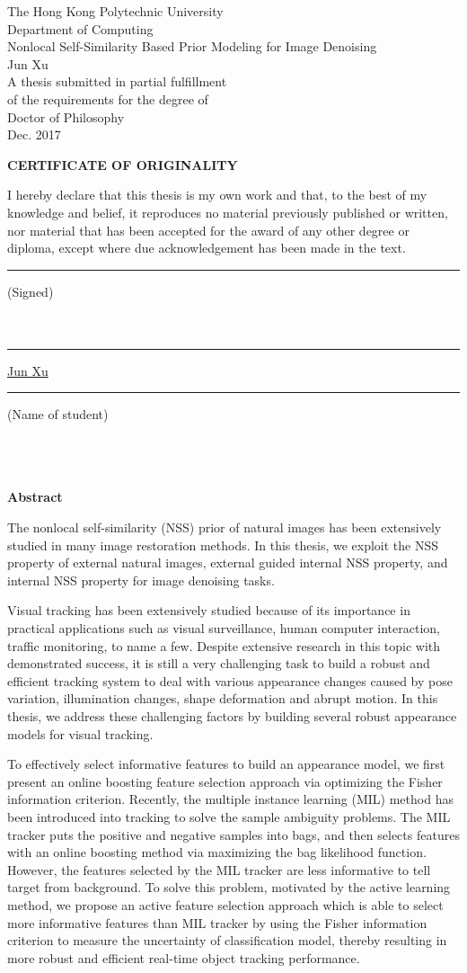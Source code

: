 \documentclass[12pt,oneside]{report}
\makeatletter
\numberwithin{figure}{chapter}
\newenvironment{preliminary}%
{\pagestyle{plain}\pagenumbering{roman}}%
{\pagenumbering{arabic}}
\newcommand\isdefinedsig[1]{%
  \edef\@tempa{#1}%
  \def\@tempb{}%
  \ifx\@tempa\@tempb
	\else\rule[-4.5pt]{4cm}{0.5pt}\signname\\ \\{#1}\\
  \fi
}
\newcommand\isdefinedsigname[1]{%
  \edef\@tempa{#1}%
  \def\@tempb{}%
  \ifx\@tempa\@tempb
	\else\rule[-5pt]{0.05cm}{0.5pt}\underline{Jun Xu}\rule[-5pt]{1.5cm}{0.5pt}\stuname\\ \\{#1}\\%
  \fi
}
\newcommand\isdefinedspinetitle[1]{%
  \edef\@tempa{#1}%
  \def\@tempb{}%
  \ifx\@tempa\@tempb
	\else (Spine title: #1)\\
  \fi
}
\newcommand{\signname}{(Signed)}
\newcommand{\stuname}{(Name of student)}
\newcommand{\department}{Computing}
\newcommand{\degree}{Doctor of Philosophy}
\newcommand{\firstname}{Jun}
\newcommand{\middlename}{}
\newcommand{\lastname}{Xu}
\newcommand{\authorname}{{\firstname} {\middlename} {\lastname}}
\newcommand{\titl}{Real-time and Robust Visual Tracking}
\newcommand{\thesisformat}{Monograph} %
\newcommand{\gyear}{\number\year}
\renewcommand{\maketitle}
{\begin{titlepage}
   \setcounter{page}{1}
   \begin{large}
   \begin{center}
      \mbox{}
      \vfill
	{\LARGE The Hong Kong Polytechnic University} \\
    {\Large Department of Computing}\\
      \vfill
      {\LARGE Nonlocal Self-Similarity Based Prior Modeling for Image Denoising} \\
      \vfill
       {\firstname}  {\lastname}\\

      \vfill
		A thesis submitted in partial fulfillment\\
		of the requirements for the degree of\\
		\degree\\
		\vfill
		\vfill
     Dec. 2017\\
      \vspace*{.2in}


   \end{center}
   \end{large}
   \end{titlepage}

}%
\newcommand{\makecert}{
   \setcounter{page}{2}
\vfill
\begin{center}
\large
\textbf{CERTIFICATE OF ORIGINALITY}\\
\vfill
\end{center}

\vfill
I hereby declare that this thesis is my own work and that, to the best of my knowledge and belief, it reproduces no material previously published or written, nor material that has been accepted for the award of any other degree or diploma, except where due acknowledgement has been made in the text. \\
\vfill
\vfill
\vfill
\hspace{2.5in}\isdefinedsig{ }
\vfill
\hspace{2.5in}\isdefinedsigname{ }\\
\vfill
\vfill
\vfill
\vfill
}
\makeatother
\begin{document}


\begin{preliminary}

\maketitle
{}
\makecert
\newpage


\Large\begin{center}\textbf{Abstract}\end{center}\normalsize


The nonlocal self-similarity (NSS) prior of natural images has been extensively studied in many image restoration methods. In this thesis, we exploit the NSS property of external natural images, external guided internal NSS property, and internal NSS property for image denoising tasks.



Visual tracking has been extensively studied because of its importance in practical applications such as visual surveillance, human computer interaction, traffic monitoring, to name a few. Despite extensive research in this topic with demonstrated success, it is still a very challenging task to build a robust and efficient tracking system to deal with various appearance changes caused by pose variation, illumination changes, shape deformation and abrupt motion. In this thesis, we address these challenging factors by building several robust appearance models for visual tracking.

%
To effectively select informative features to build an appearance model, we first present an online boosting feature selection approach via optimizing the Fisher information criterion. Recently, the multiple instance learning (MIL) method has been introduced into tracking to solve the sample ambiguity problems. The MIL tracker puts the positive and negative samples into bags, and then selects features with an online boosting method via maximizing the bag likelihood function. However, the features selected by the MIL tracker are less informative to tell target from background. To solve this problem, motivated by the active learning method, we propose an active feature selection approach which is able to select more informative features than MIL tracker by using the Fisher information criterion to measure the uncertainty of classification model, thereby resulting in more robust and efficient real-time object tracking performance.


\end{preliminary}
\end{document}

